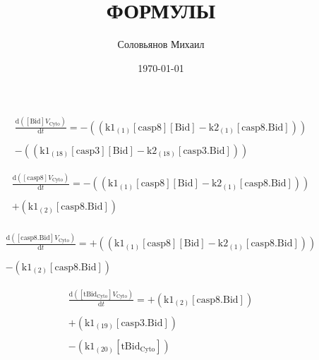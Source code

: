 \documentclass[a4paper,12pt]{article} %
\author{Соловьянов Михаил }
\title{ФОРМУЛЫ}
\date{\today}
\newcommand{\M}[1]{\mathrm{#1}}
\begin{document}








\begin{equation}
\begin{split}
\frac {\M{d}( {{\M{[Bid]}}    {V}_{\M{Cyto}} } ) }  {\M{d}{t} }  =  {  -  (( {{\M{k1}}_{\M{(1)}}    {\M{[casp8]}}    {\M{[Bid]}}  -  {\M{k2}}_{\M{(1)}}    {\M{[casp8.Bid]}} } )) } \\ 
  \\ 
   {  -  (( {{\M{k1}}_{\M{(18)}}    {\M{[casp3]}}    {\M{[Bid]}}  -  {\M{k2}}_{\M{(18)}}    {\M{[casp3.Bid]}} } )) } 
\end{split}
\end{equation}


\begin{equation}
\begin{split}
\frac {\M{d}( {{\M{[casp8]}}    {V}_{\M{Cyto}} } ) }  {\M{d}{t} }  =  {  -  (( {{\M{k1}}_{\M{(1)}}    {\M{[casp8]}}    {\M{[Bid]}}  -  {\M{k2}}_{\M{(1)}}    {\M{[casp8.Bid]}} } )) } \\ 
  \\ 
   {  +  ( {{\M{k1}}_{\M{(2)}}    {\M{[casp8.Bid]}} } ) } \\  
\end{split}
\end{equation}

\begin{equation}
\begin{split}
\frac {\M{d}( {{\M{[casp8.Bid]}}    {V}_{\M{Cyto}} } ) }  {\M{d}{t} }  =  {  +  (( {{\M{k1}}_{\M{(1)}}    {\M{[casp8]}}    {\M{[Bid]}}  -  {\M{k2}}_{\M{(1)}}    {\M{[casp8.Bid]}} } )) } \\ 
  \\ 
   {  -  ( {{\M{k1}}_{\M{(2)}}    {\M{[casp8.Bid]}} } ) } 
\end{split}
\end{equation}


\begin{equation}
\begin{split}
\frac {\M{d}( {{\M{[tBid_{Cyto}]}}    {V}_{\M{Cyto}} } ) }  {\M{d}{t} }  =  {  +  ( {{\M{k1}}_{\M{(2)}}    {\M{[casp8.Bid]}} } ) } \\ 
  \\ 
   {  +  ( {{\M{k1}}_{\M{(19)}}    {\M{[casp3.Bid]}} } ) } \\ 
  \\ 
   {  -  ( {{\M{k1}}_{\M{(20)}}    {\M{[tBid_{Cyto}]}} } ) } 
\end{split}
\end{equation}
\end{document}

